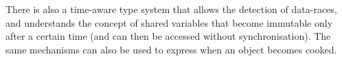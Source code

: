 There is also a time-aware type system \cite{Matsakis:2010:TTS:1869459.1869511}
that allows the detection of data-races, and understands the concept of shared
variables that become immutable only after a certain time
(and can then be accessed without synchronisation).  The same mechanisms can also be
used to express when an object becomes cooked.
